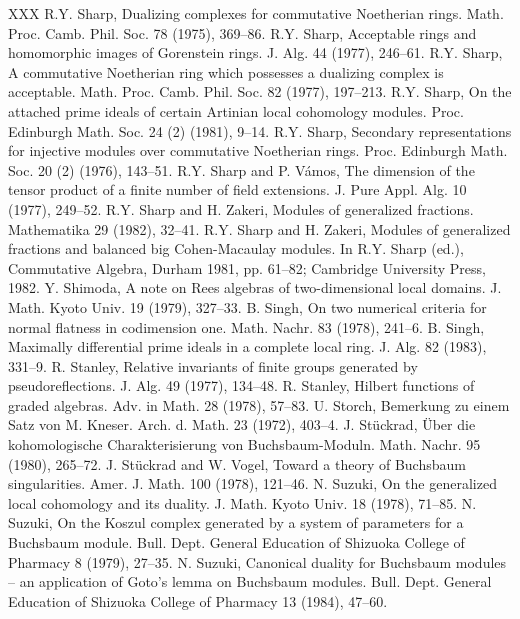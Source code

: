 \begin{thebibliography}{XXX}
 R.Y. Sharp, Dualizing complexes for commutative Noetherian rings. Math. Proc. Camb. Phil. Soc. 78 (1975), 369--86.
 R.Y. Sharp, Acceptable rings and homomorphic images of Gorenstein rings. J. Alg. 44 (1977), 246--61.
 R.Y. Sharp, A commutative Noetherian ring which possesses a dualizing complex is acceptable. Math. Proc. Camb. Phil. Soc. 82 (1977), 197--213.
 R.Y. Sharp, On the attached prime ideals of certain Artinian local cohomology modules. Proc. Edinburgh Math. Soc. 24 (2) (1981), 9--14.
 R.Y. Sharp, Secondary representations for injective modules over commutative Noetherian rings. Proc. Edinburgh Math. Soc. 20 (2) (1976), 143--51.
 R.Y. Sharp and P. V\'amos, The dimension of the tensor product of a finite number of field extensions. J. Pure Appl. Alg. 10 (1977), 249--52.
 R.Y. Sharp and H. Zakeri, Modules of generalized fractions. Mathematika 29 (1982), 32--41.
 R.Y. Sharp and H. Zakeri, Modules of generalized fractions and balanced big Cohen-Macaulay modules. In R.Y. Sharp (ed.), Commutative Algebra, Durham 1981, pp. 61--82; Cambridge University Press, 1982.
 Y. Shimoda, A note on Rees algebras of two-dimensional local domains. J. Math. Kyoto Univ. 19 (1979), 327--33.
 B. Singh, On two numerical criteria for normal flatness in codimension one. Math. Nachr. 83 (1978), 241--6.
 B. Singh, Maximally differential prime ideals in a complete local ring. J. Alg. 82 (1983), 331--9.
 R. Stanley, Relative invariants of finite groups generated by pseudoreflections. J. Alg. 49 (1977), 134--48.
 R. Stanley, Hilbert functions of graded algebras. Adv. in Math. 28 (1978), 57--83.
 U. Storch, Bemerkung zu einem Satz von M. Kneser. Arch. d. Math. 23 (1972), 403--4.
 J. St\"uckrad, \"Uber die kohomologische Charakterisierung von Buchsbaum-Moduln. Math. Nachr. 95 (1980), 265--72.
 J. St\"uckrad and W. Vogel, Toward a theory of Buchsbaum singularities. Amer. J. Math. 100 (1978), 121--46.
 N. Suzuki, On the generalized local cohomology and its duality. J. Math. Kyoto Univ. 18 (1978), 71--85.
 N. Suzuki, On the Koszul complex generated by a system of parameters for a Buchsbaum module. Bull. Dept. General Education of Shizuoka College of Pharmacy 8 (1979), 27--35.
 N. Suzuki, Canonical duality for Buchsbaum modules -- an application of Goto's lemma on Buchsbaum modules. Bull. Dept. General Education of Shizuoka College of Pharmacy 13 (1984), 47--60.

\end{thebibliography}
